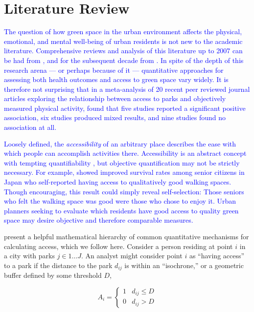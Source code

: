 \documentclass[shortAfour,sageh.bst]{sagej}
\begin{document}
\hypertarget{literature-review}{%
\section{Literature Review}\label{literature-review}}

\label{sec:litreview}

\textcolor{blue}{
The question of how green space in the urban
environment affects the physical, emotional, and mental well-being of
urban residents is not new to the academic literature. Comprehensive
reviews and analysis of this literature up to 2007 can be had from
\citet{tzoulas2007promoting}, and for the subsequent decade from
\citet{kabisch2015human}. In spite of the depth of this research arena
--- or perhaps because of it --- quantitative approaches for assessing
both health outcomes and access to green space vary widely. It is
therefore not surprising that in a meta-analysis of 20 recent peer
reviewed journal articles exploring the relationship between access to
parks and objectively measured physical activity, \citet{Bancroft2015}
found that five studies reported a significant positive association, six
studies produced mixed results, and nine studies found no association at
all.}

\textcolor{blue}{
Loosely defined, the \emph{accessibility} of an arbitrary place
describes the ease with which people can accomplish activities there.
Accessibility is an abstract concept with tempting quantifiability
\citep{Handy1997}, but objective quantification may not be strictly
necessary. For example, \citet{takano2002urban} showed improved survival
rates among senior citizens in Japan who self-reported having access to
qualitatively good walking spaces. Though encouraging, this result could
simply reveal self-selection: Those seniors who felt the walking space
was good were those who chose to enjoy it. Urban planners seeking to
evaluate which residents have good access to quality green space may
desire objective and therefore comparable measures.}

\citet{Dong2006} present a helpful mathematical hierarchy of common
quantitative mechanisms for calculating access, which we follow here.
Consider a person residing at point \(i\) in a city with parks
\(j \in 1 \ldots J\). An analyst might consider point \(i\) as ``having
access'' to a park if the distance to the park \(d_{ij}\) is within an
``isochrone,'' or a geometric buffer defined by some threshold \(D\),

\begin{equation}\label{eq:isochrone}
A_i = \begin{cases}
      1 & d_{ij}\leq D\\
      0 & d_{ij} > D
   \end{cases}
\end{equation}
\end{document}
